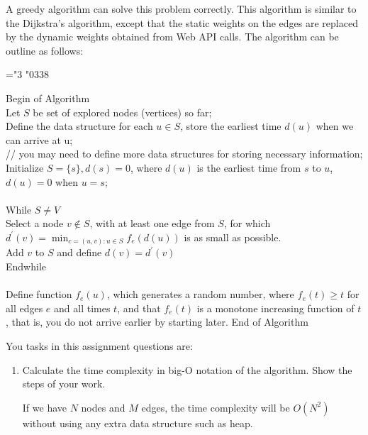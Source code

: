 \documentclass[14pt, a4paper]{article}
\begin{document}
\begin{enumerate}
A greedy algorithm can solve this problem correctly. This algorithm is similar to the Dijkstra’s algorithm, except that the static weights on the edges are replaced by the dynamic weights obtained from Web API calls. The algorithm can be outline as follows:

\Umathchardef\xnot="3 \symoperators "0338
\AtBeginDocument{
  \renewcommand\not[1]{#1\xnot}
  \renewcommand{\notin}{\not\in}
}
\begin{tcolorbox}[enhanced jigsaw,breakable,pad at break*=1mm,colback=gray!10!white,frame hidden]
  Begin of Algorithm \\
  Let $S$ be set of explored nodes (vertices) so far; \\
  Define the data structure for each $u \in S$, store the earliest time $d(u)$ when we can arrive at u; \\
  // you may need to define more data structures for storing necessary information; \\
  Initialize $S = \{ s \}, d(s) = 0$, where $d(u)$ is the earliest time from $s$ to $u$, $d(u) = 0$ when $u = s$; \\
  \\
  While $S \neq V$ \\
  Select a node $v \notin S$, with at least one edge from $S$, for which 
  $\displaystyle d^{\prime}(v) = \min_{c = (u,v): u \in S} f_e(d(u))$
  is as small as possible. \\
  Add $v$ to $S$ and define $d(v) = d^{\prime}(v)$ \\
  Endwhile\\
  \\
  Define function $f_e(u)$, which generates a random number, where $f_e(t) \ge t$ for all edges $e$ and all times $t$, and that $f_e(t)$ is a monotone increasing function of $t$, that is, you do not arrive earlier by starting later. End of Algorithm
\end{tcolorbox}

You tasks in this assignment questions are:

\begin{enumerate}[label*=\arabic*]
\item Calculate the time complexity in big-O notation of the algorithm. Show the steps of your work. 

If we have $N$ nodes and $M$ edges, the time complexity will be $O(N^2)$ without using any extra data structure such as heap. \\


\end{enumerate}
\end{enumerate}
\end{document}
